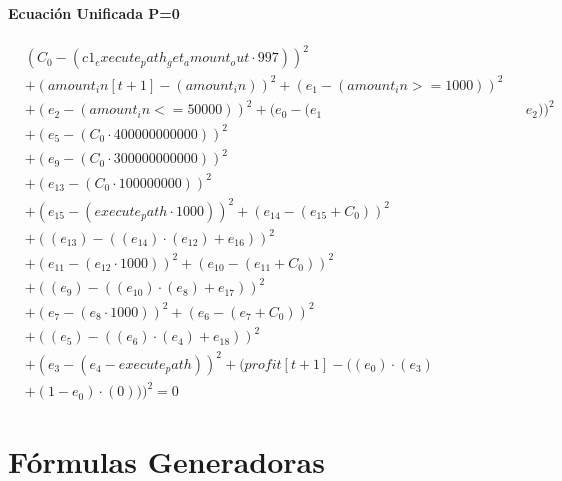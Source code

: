 \documentclass[10pt, a4paper]{article}
\begin{document}
\subsection*{Ecuación Unificada P=0}
\begin{align*}
& (C_{0} - (c1_execute_path_get_amount_out  \cdot  997))^{2} \\
& + (amount_in[t+1] - (amount_in))^{2} + (e_{1} - (amount_in >= 1000))^{2} \\
& + (e_{2} - (amount_in <= 50000))^{2} + (e_{0} - (e_{1} && e_{2}))^{2} \\
& + (e_{5} - (C_{0}  \cdot  400000000000))^{2} \\
& + (e_{9} - (C_{0}  \cdot  300000000000))^{2} \\
& + (e_{13} - (C_{0}  \cdot  100000000))^{2} \\
& + (e_{15} - (execute_path  \cdot  1000))^{2} + (e_{14} - (e_{15} + C_{0}))^{2} \\
& + ((e_{13}) - ((e_{14})  \cdot  (e_{12}) + e_{16}))^{2} \\
& + (e_{11} - (e_{12}  \cdot  1000))^{2} + (e_{10} - (e_{11} + C_{0}))^{2} \\
& + ((e_{9}) - ((e_{10})  \cdot  (e_{8}) + e_{17}))^{2} \\
& + (e_{7} - (e_{8}  \cdot  1000))^{2} + (e_{6} - (e_{7} + C_{0}))^{2} \\
& + ((e_{5}) - ((e_{6})  \cdot  (e_{4}) + e_{18}))^{2} \\
& + (e_{3} - (e_{4} - execute_path))^{2} + (profit[t+1] - ((e_{0})  \cdot  (e_{3}) \\
& + (1 - e_{0})  \cdot  (0)))^{2} = 0
\end{align*}\part{Fórmulas Generadoras}
\end{document}
